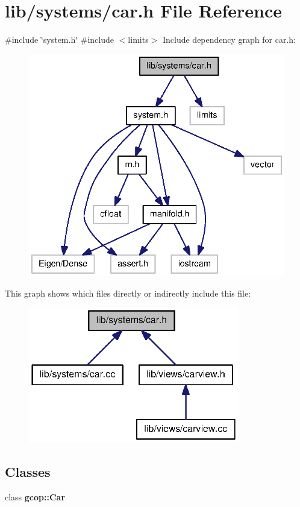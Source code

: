 \section{lib/systems/car.h \-File \-Reference}
\label{car_8h}
{\ttfamily \#include \char`\"{}system.\-h\char`\"{}}\*
{\ttfamily \#include $<$limits$>$}\*
\-Include dependency graph for car.\-h\-:
\nopagebreak
\begin{figure}[H]
\begin{center}
\leavevmode
\includegraphics[width=336pt]{car_8h__incl}
\end{center}
\end{figure}
\-This graph shows which files directly or indirectly include this file\-:
\nopagebreak
\begin{figure}[H]
\begin{center}
\leavevmode
\includegraphics[width=260pt]{car_8h__dep__incl}
\end{center}
\end{figure}
\subsection*{\-Classes}
\begin{DoxyCompactItemize}
\item 
class {\bf gcop\-::\-Car}
\end{DoxyCompactItemize}
